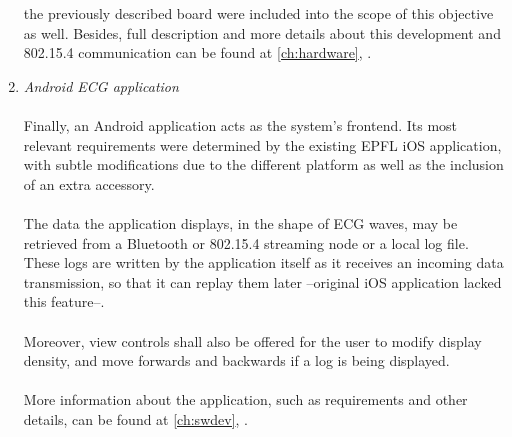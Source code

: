 \begin{enumerate}
				the previously described board were included into the scope of this objective as well. Besides, 
				full description and more details about this development and 802.15.4 communication can be found 
				at \autoref{ch:hardware}, .\\
			\item \emph{Android ECG application}\\\\
				Finally, an Android application acts as the system's frontend. Its most relevant requirements were
				determined by the existing EPFL iOS application, with subtle modifications due to the different
				platform as well as the inclusion of an extra accessory.\\\\
				The data the application displays, in the shape of ECG waves, may be retrieved from a Bluetooth
				or 802.15.4 streaming node or a local log file. These logs are written by the application itself
				as it receives an incoming data transmission, so that it can replay them later --original
				iOS application lacked this feature--.\\\\
				Moreover, view controls shall also be offered for the user to modify display density, and move
				forwards and backwards if a log is being displayed.\\\\
				More information about the application, such as requirements and other details, can be found
				at \autoref{ch:swdev}, .\\
		\end{enumerate}
		
